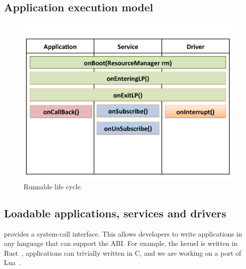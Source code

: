 \subsection{Application execution model}
\begin{figure}
 \centering
\includegraphics[width=1\columnwidth]{img/appcycle.png}
\caption{Runnable life cycle.}
 \label{fig:appcycle}
\end{figure}


\subsection{Loadable applications, services and drivers}

\name provides a system-call interface. This
allows developers to write applications in any language that can support the
ABI. For example, the \name kernel is written in Rust~\cite{rust}, applications
can trivially written in C, and we are working on a port of Lua~\cite{lua}.

